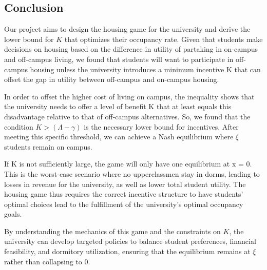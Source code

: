 \documentclass[12pt]{article}
\begin{document}
\subsection{Conclusion}
Our project aims to design the housing game for the university and derive the lower bound for $K$ that optimizes their occupancy rate. Given that students make decisions on housing based on the difference in utility of partaking in on-campus and off-campus living, we found that students will want to participate in off-campus housing unless the university introduces a minimum incentive K that can offset the gap in utility between off-campus and on-campus housing. 

In order to offset the higher cost of living on campus, the inequality shows that the university needs to offer a level of benefit K that at least equals this disadvantage relative to that of off-campus alternatives. So, we found that the condition $K > (\Lambda - \gamma)$ is the necessary lower bound for incentives. After meeting this specific threshold, we can achieve a Nash equilibrium where $\xi$ students remain on campus.

If K is not sufficiently large, the game will only have one equilibrium at x = 0. This is the worst-case scenario where no upperclassmen stay in dorms, leading to losses in revenue for the university, as well as lower total student utility. The housing game thus requires the correct incentive structure to have students' optimal choices lead to the fulfillment of the university’s optimal occupancy goals.

By understanding the mechanics of this game and the constraints on $K$, the university can develop targeted policies to balance student preferences, financial feasibility, and dormitory utilization, ensuring that the equilibrium remains at $\xi$ rather than collapsing to 0.
\end{document}
